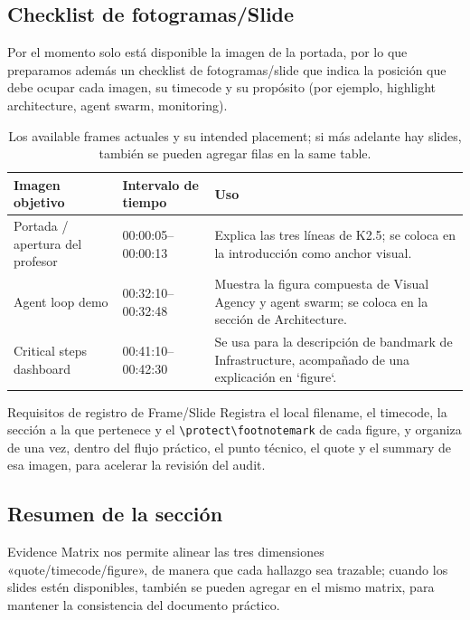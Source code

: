 \subsection{Checklist de fotogramas/Slide}
Por el momento solo está disponible la imagen de la portada, por lo que preparamos además un checklist de fotogramas/slide que indica la posición que debe ocupar cada imagen, su timecode y su propósito (por ejemplo, highlight architecture, agent swarm, monitoring).

\begin{table}[H]
\footnotesize
\centering
\begin{tabular}{p{3cm}p{4cm}p{5cm}}
\toprule
Imagen objetivo & Intervalo de tiempo & Uso \\
\midrule
Portada / apertura del profesor & 00:00:05--00:00:13 & Explica las tres líneas de K2.5; se coloca en la introducción como anchor visual. \\
Agent loop demo & 00:32:10--00:32:48 & Muestra la figura compuesta de Visual Agency y agent swarm; se coloca en la sección de Architecture. \\
Critical steps dashboard & 00:41:10--00:42:30 & Se usa para la descripción de bandmark de Infrastructure, acompañado de una explicación en `figure`. \\
\bottomrule
\end{tabular}
\caption{Los available frames actuales y su intended placement; si más adelante hay slides, también se pueden agregar filas en la same table.}
\end{table}

\begin{importantbox}{Requisitos de registro de Frame/Slide}
Registra el local filename, el timecode, la sección a la que pertenece y el \verb|\protect\footnotemark| de cada figure, y organiza de una vez, dentro del flujo práctico, el punto técnico, el quote y el summary de esa imagen, para acelerar la revisión del audit.
\end{importantbox}

\subsection{Resumen de la sección}
Evidence Matrix nos permite alinear las tres dimensiones «quote/timecode/figure», de manera que cada hallazgo sea trazable; cuando los slides estén disponibles, también se pueden agregar en el mismo matrix, para mantener la consistencia del documento práctico.
